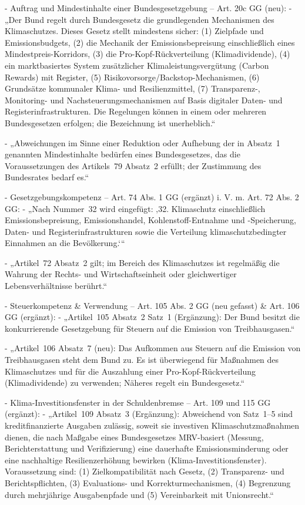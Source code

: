 \documentclass[12pt,a4paper]{scrartcl}
\begin{document}
- Auftrag und Mindestinhalte einer Bundesgesetzgebung -- Art. 20c GG (neu):
- „Der Bund regelt durch Bundesgesetz die grundlegenden Mechanismen des Klimaschutzes. Dieses Gesetz stellt mindestens sicher: (1) Zielpfade und Emissionsbudgets, (2) die Mechanik der Emissionsbepreisung einschließlich eines Mindestpreis-Korridors, (3) die Pro-Kopf-Rückverteilung (Klimadividende), (4) ein marktbasiertes System zusätzlicher Klimaleistungsvergütung (Carbon Rewards) mit Register, (5) Risikovorsorge/Backstop-Mechanismen, (6) Grundsätze kommunaler Klima- und Resilienzmittel, (7) Transparenz-, Monitoring- und Nachsteuerungsmechanismen auf Basis digitaler Daten- und Registerinfrastrukturen. Die Regelungen können in einem oder mehreren Bundesgesetzen erfolgen; die Bezeichnung ist unerheblich.“

- „Abweichungen im Sinne einer Reduktion oder Aufhebung der in Absatz 1 genannten Mindestinhalte bedürfen eines Bundesgesetzes, das die Voraussetzungen des Artikels 79 Absatz 2 erfüllt; der Zustimmung des Bundesrates bedarf es.“

- Gesetzgebungskompetenz -- Art. 74 Abs. 1 GG (ergänzt) i. V. m. Art. 72 Abs. 2 GG:
- „Nach Nummer 32 wird eingefügt: ‚32. Klimaschutz einschließlich Emissionsbepreisung, Emissionshandel, Kohlenstoff-Entnahme und -Speicherung, Daten- und Registerinfrastrukturen sowie die Verteilung klimaschutzbedingter Einnahmen an die Bevölkerung.‘“

- „Artikel 72 Absatz 2 gilt; im Bereich des Klimaschutzes ist regelmäßig die Wahrung der Rechts- und Wirtschaftseinheit oder gleichwertiger Lebensverhältnisse berührt.“

- Steuerkompetenz \& Verwendung -- Art. 105 Abs. 2 GG (neu gefasst) \& Art. 106 GG (ergänzt):
- „Artikel 105 Absatz 2 Satz 1 (Ergänzung): Der Bund besitzt die konkurrierende Gesetzgebung für Steuern auf die Emission von Treibhausgasen.“

- „Artikel 106 Absatz 7 (neu): Das Aufkommen aus Steuern auf die Emission von Treibhausgasen steht dem Bund zu. Es ist überwiegend für Maßnahmen des Klimaschutzes und für die Auszahlung einer Pro-Kopf-Rückverteilung (Klimadividende) zu verwenden; Näheres regelt ein Bundesgesetz.“

- Klima-Investitionsfenster in der Schuldenbremse -- Art. 109 und 115 GG (ergänzt):
- „Artikel 109 Absatz 3 (Ergänzung): Abweichend von Satz 1--5 sind kreditfinanzierte Ausgaben zulässig, soweit sie investiven Klimaschutzmaßnahmen dienen, die nach Maßgabe eines Bundesgesetzes MRV-basiert (Messung, Berichterstattung und Verifizierung) eine dauerhafte Emissionsminderung oder eine nachhaltige Resilienzerhöhung bewirken (Klima-Investitionsfenster). Voraussetzung sind: (1) Zielkompatibilität nach Gesetz, (2) Transparenz- und Berichtspflichten, (3) Evaluations- und Korrekturmechanismen, (4) Begrenzung durch mehrjährige Ausgabenpfade und (5) Vereinbarkeit mit Unionsrecht.“
\end{document}
